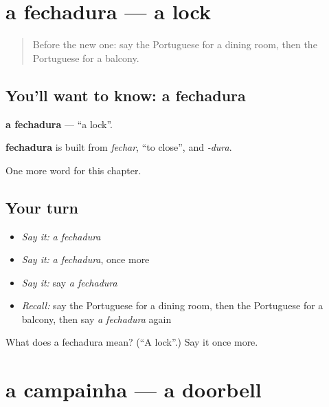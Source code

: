 \section[a fechadura]{a fechadura — a lock}

\label{lesson:PT-C157-fechadura}



\begin{quote}
Before the new one: say the Portuguese for a dining room, then the Portuguese for a balcony.
\end{quote}

\subsection*{You'll want to know: a fechadura}
\textbf{a fechadura} — \textquotedblleft{}a lock\textquotedblright{}.

\begin{cousinweb}
\textbf{fechadura} is built from \emph{fechar}, \textquotedblleft{}to close\textquotedblright{}, and \emph{-dura}.
\end{cousinweb}

\begin{grammarlens}[title={What you've built}]
One more word for this chapter.
\end{grammarlens}

\subsection*{Your turn}
\begin{itemize}
\raggedright
  \item \emph{Say it:} \emph{a fechadura}
  \item \emph{Say it:} \emph{a fechadura}, once more
  \item \emph{Say it:} say \emph{a fechadura}
  \item \emph{Recall:} say the Portuguese for a dining room, then the Portuguese for a balcony, then say \emph{a fechadura} again
\end{itemize}

\begin{tcolorbox}[breakable,colback=teal!4,colframe=teal!35!black,title={Before you move on}]
What does a fechadura mean? (\textquotedblleft{}A lock\textquotedblright{}.) Say it once more.
\end{tcolorbox}
\section[a campainha]{a campainha — a doorbell}

